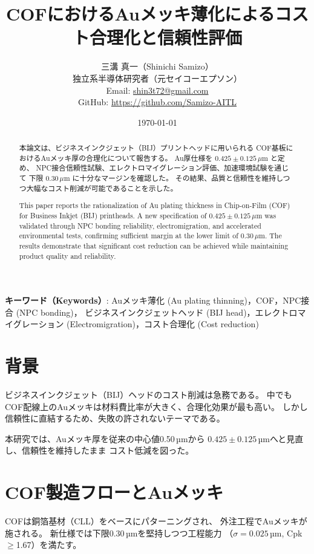 \documentclass[a4paper,12pt]{article}
\title{COFにおけるAuメッキ薄化によるコスト合理化と信頼性評価}
\author{三溝 真一（Shinichi Samizo）\\
独立系半導体研究者（元セイコーエプソン）\\
Email: \href{mailto:shin3t72@gmail.com}{shin3t72@gmail.com}\\
GitHub: \url{https://github.com/Samizo-AITL}}
\date{\today}
\begin{document}
\maketitle

\begin{abstract}
本論文は、ビジネスインクジェット（BIJ）プリントヘッドに用いられる
COF基板におけるAuメッキ厚の合理化について報告する。
Au厚仕様を $0.425 \pm 0.125\,\mu$m と定め、
NPC接合信頼性試験、エレクトロマイグレーション評価、加速環境試験を通じて
下限 $0.30\,\mu$m に十分なマージンを確認した。
その結果、品質と信頼性を維持しつつ大幅なコスト削減が可能であることを示した。
\end{abstract}

\begin{abstract}
This paper reports the rationalization of Au plating thickness
in Chip-on-Film (COF) for Business Inkjet (BIJ) printheads.
A new specification of $0.425 \pm 0.125\,\mu$m was validated
through NPC bonding reliability, electromigration, and accelerated
environmental tests, confirming sufficient margin at the lower limit
of $0.30\,\mu$m. The results demonstrate that significant cost reduction
can be achieved while maintaining product quality and reliability.
\end{abstract}

\textbf{キーワード（Keywords）}: Auメッキ薄化 (Au plating thinning)，COF，NPC接合 (NPC bonding)，
ビジネスインクジェットヘッド (BIJ head)，エレクトロマイグレーション (Electromigration)，コスト合理化 (Cost reduction)

\section{背景}
ビジネスインクジェット（BIJ）ヘッドのコスト削減は急務である。
中でもCOF配線上のAuメッキは材料費比率が大きく、合理化効果が最も高い。
しかし信頼性に直結するため、失敗の許されないテーマである。

本研究では、Auメッキ厚を従来の中心値0.50\,µmから
$0.425 \pm 0.125$\,µmへと見直し、信頼性を維持したまま
コスト低減を図った。

\section{COF製造フローとAuメッキ}
COFは銅箔基材（CLL）をベースにパターニングされ、
外注工程でAuメッキが施される。
新仕様では下限0.30\,µmを堅持しつつ工程能力
（$\sigma=0.025$\,µm, Cpk$\geq$1.67）を満たす。
\end{document}
